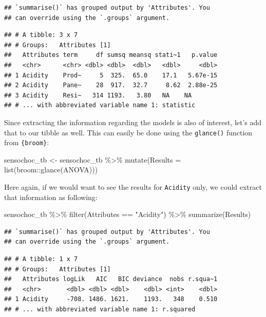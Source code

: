 \documentclass[
]{krantz}
\makeatletter
\newenvironment{Shaded}{\begin{snugshade}}{\end{snugshade}}
\newcommand{\AttributeTok}[1]{\textcolor[rgb]{0.61,0.61,0.61}{#1}}
\newcommand{\FunctionTok}[1]{\textcolor[rgb]{0,0,0}{#1}}
\newcommand{\NormalTok}[1]{#1}
\newcommand{\OtherTok}[1]{\textcolor[rgb]{0.37,0.37,0.37}{#1}}
\newcommand{\SpecialCharTok}[1]{\textcolor[rgb]{0,0,0}{#1}}
\newcommand{\StringTok}[1]{\textcolor[rgb]{0.5,0.5,0.5}{#1}}
\newenvironment{kframe}{%
\medskip{}
\setlength{\fboxsep}{.8em}
 \def\at@end@of@kframe{}%
 \ifinner\ifhmode%
  \def\at@end@of@kframe{\end{minipage}}%
  \begin{minipage}{\columnwidth}%
 \fi\fi%
 \def\FrameCommand##1{\hskip\@totalleftmargin \hskip-\fboxsep
 \colorbox{shadecolor}{##1}\hskip-\fboxsep
     \hskip-\linewidth \hskip-\@totalleftmargin \hskip\columnwidth}%
 \MakeFramed {\advance\hsize-\width
   \@totalleftmargin\z@ \linewidth\hsize
   \@setminipage}}%
 {\par\unskip\endMakeFramed%
 \at@end@of@kframe}
\renewenvironment{Shaded}{\begin{kframe}}{\end{kframe}}
\makeatother
\begin{document}
\begin{verbatim}
## `summarise()` has grouped output by 'Attributes'. You
## can override using the `.groups` argument.
\end{verbatim}

\begin{verbatim}
## # A tibble: 3 x 7
## # Groups:   Attributes [1]
##   Attributes term     df sumsq meansq stati~1   p.value
##   <chr>      <chr> <dbl> <dbl>  <dbl>   <dbl>     <dbl>
## 1 Acidity    Prod~     5  325.  65.0    17.1   5.67e-15
## 2 Acidity    Pane~    28  917.  32.7     8.62  2.88e-25
## 3 Acidity    Resi~   314 1193.   3.80   NA    NA       
## # ... with abbreviated variable name 1: statistic
\end{verbatim}

Since extracting the information regarding the models is also of interest, let's add that to our tibble as well. This can easily be done using the \texttt{glance()} function from \texttt{\{broom\}}:

\begin{Shaded}
\begin{Highlighting}[]
\NormalTok{sensochoc\_tb }\OtherTok{\textless{}{-}}\NormalTok{ sensochoc\_tb }\SpecialCharTok{\%\textgreater{}\%} 
  \FunctionTok{mutate}\NormalTok{(}\AttributeTok{Results =} \FunctionTok{list}\NormalTok{(broom}\SpecialCharTok{::}\FunctionTok{glance}\NormalTok{(ANOVA)))}
\end{Highlighting}
\end{Shaded}

Here again, if we would want to see the results for \texttt{Acidity} only, we could extract that information as following:

\begin{Shaded}
\begin{Highlighting}[]
\NormalTok{sensochoc\_tb }\SpecialCharTok{\%\textgreater{}\%} 
  \FunctionTok{filter}\NormalTok{(Attributes }\SpecialCharTok{==} \StringTok{"Acidity"}\NormalTok{) }\SpecialCharTok{\%\textgreater{}\%} 
  \FunctionTok{summarize}\NormalTok{(Results)}
\end{Highlighting}
\end{Shaded}

\begin{verbatim}
## `summarise()` has grouped output by 'Attributes'. You
## can override using the `.groups` argument.
\end{verbatim}

\begin{verbatim}
## # A tibble: 1 x 7
## # Groups:   Attributes [1]
##   Attributes logLik   AIC   BIC deviance  nobs r.squa~1
##   <chr>       <dbl> <dbl> <dbl>    <dbl> <int>    <dbl>
## 1 Acidity     -708. 1486. 1621.    1193.   348    0.510
## # ... with abbreviated variable name 1: r.squared
\end{verbatim}
\end{document}
